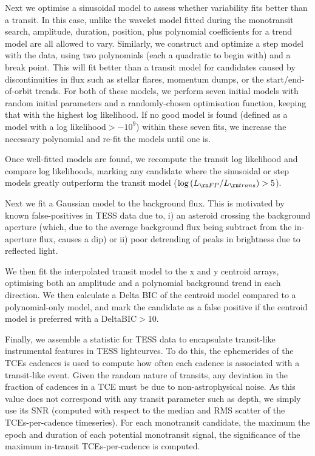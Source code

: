 \documentclass{article}
\begin{document}
Next we optimise a sinusoidal model to assess whether variability fits better than a transit. 
In this case, unlike the wavelet model fitted during the monotransit search, amplitude, duration, position, plus polynomial coefficients for a trend model are all allowed to vary.
Similarly, we construct and optimize a step model with the data, using two polynomials (each a quadratic to begin with) and a break point. 
This will fit better than a transit model for candidates caused by discontinuities in flux such as stellar flares, momentum dumps, or the start/end-of-orbit trends.
For both of these models, we perform seven initial models with random initial parameters and a randomly-chosen optimisation function, keeping that with the highest log likelihood. 
If no good model is found (defined as a model with a log likelihood$>-10^{9}$) within these seven fits, we increase the necessary polynomial and re-fit the models until one is.

Once well-fitted models are found, we recompute the transit log likelihood and compare log likelihoods, marking any candidate where the sinusoidal or step models greatly outperform the transit model ($\log{\left({L_{\rn FP}}/{L_{\rn trans}}\right)}>5$).

Next we fit a Gaussian model to the background flux. This is motivated by known false-positives in TESS data due to, i) an asteroid crossing the background aperture (which, due to the average background flux being subtract from the in-aperture flux, causes a dip) or ii) poor detrending of peaks in brightness due to reflected light.

We then fit the interpolated transit model to the x and y centroid arrays, optimising both an amplitude and a polynomial background trend in each direction. 
We then calculate a Delta BIC of the centroid model compared to a polynomial-only model, and mark the candidate as a false positive if the centroid model is preferred with a DeltaBIC$>10$.

Finally, we assemble a statistic for TESS data to encapsulate transit-like instrumental features in TESS lightcurves. To do this, the ephemerides of the TCEs cadences is used to compute how often each cadence is associated with a transit-like event.
Given the random nature of transits, any deviation in the fraction of cadences in a TCE must be due to non-astrophysical noise.
As this value does not correspond with any transit parameter such as depth, we simply use its SNR (computed with respect to the median and RMS scatter of the TCEs-per-cadence timeseries). For each monotransit candidate, the maximum  the epoch and duration of each potential monotransit signal, the significance of the maximum in-transit TCEs-per-cadence is computed.
\end{document}
